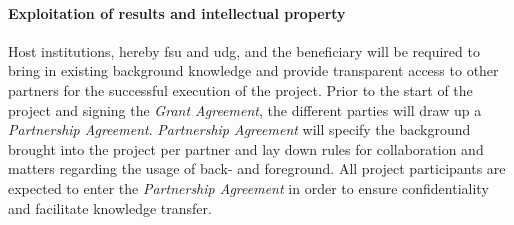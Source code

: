 
\paragraph{Exploitation of results and intellectual property}

Host institutions, hereby \ac{fsu} and \ac{udg}, and the beneficiary will be required to bring in existing background knowledge and provide transparent access to other partners for the successful execution of the project.
Prior to the start of the project and signing the \emph{Grant Agreement}, the different parties will draw up a \emph{Partnership Agreement}.
\emph{Partnership Agreement} will specify the background brought into the project per partner and lay down rules for collaboration and matters regarding the usage of back- and foreground.
All project participants are expected to enter the \emph{Partnership Agreement} in order to ensure confidentiality and facilitate knowledge transfer.

